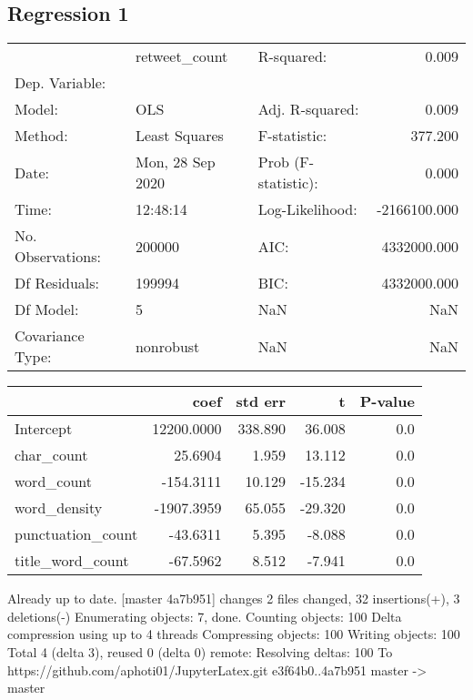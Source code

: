 
\subsection{Regression 1}
\begin{tabular}{lllr}
\toprule
{} &     retweet\_count &           R-squared: &        0.009 \\
Dep. Variable:    &                   &                      &              \\
\midrule
Model:            &               OLS &      Adj. R-squared: &        0.009 \\
Method:           &     Least Squares &         F-statistic: &      377.200 \\
Date:             &  Mon, 28 Sep 2020 &  Prob (F-statistic): &        0.000 \\
Time:             &          12:48:14 &      Log-Likelihood: & -2166100.000 \\
No. Observations: &            200000 &                 AIC: &  4332000.000 \\
Df Residuals:     &            199994 &                 BIC: &  4332000.000 \\
Df Model:         &                 5 &                  NaN &          NaN \\
Covariance Type:  &         nonrobust &                  NaN &          NaN \\
\bottomrule
\end{tabular}

\begin{tabular}{lrrrr}
\toprule
{} &        coef &  std err &       t &  P-value \\
\midrule
Intercept         &  12200.0000 &  338.890 &  36.008 &      0.0 \\
char\_count        &     25.6904 &    1.959 &  13.112 &      0.0 \\
word\_count        &   -154.3111 &   10.129 & -15.234 &      0.0 \\
word\_density      &  -1907.3959 &   65.055 & -29.320 &      0.0 \\
punctuation\_count &    -43.6311 &    5.395 &  -8.088 &      0.0 \\
title\_word\_count  &    -67.5962 &    8.512 &  -7.941 &      0.0 \\
\bottomrule
\end{tabular}



Already up to date.
[master 4a7b951] changes
 2 files changed, 32 insertions(+), 3 deletions(-)
Enumerating objects: 7, done.
Counting objects: 100%
Delta compression using up to 4 threads
Compressing objects: 100%
Writing objects: 100%
Total 4 (delta 3), reused 0 (delta 0)
remote: Resolving deltas: 100%
To https://github.com/aphoti01/JupyterLatex.git
   e3f64b0..4a7b951  master -> master

